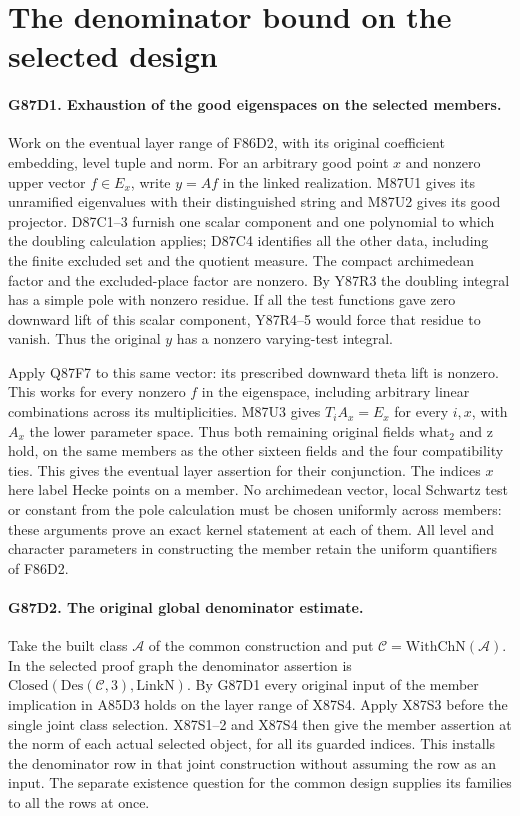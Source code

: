 \section{The denominator bound on the selected design}

\paragraph{G87D1. Exhaustion of the good eigenspaces on the selected members.}
Work on the eventual layer range of F86D2, with its original
coefficient embedding, level tuple and norm. For an arbitrary good
point $x$ and nonzero upper vector $f\in E_x$, write $y=Af$ in
the linked realization. M87U1 gives its unramified eigenvalues
with their distinguished string and M87U2 gives its good projector.
D87C1--3 furnish one scalar component and one polynomial to which
the doubling calculation applies; D87C4 identifies all the other
data, including the finite excluded set and the quotient measure.
The compact archimedean factor and the excluded-place factor are
nonzero. By Y87R3 the doubling integral has a simple pole with
nonzero residue. If all the test functions gave zero downward
lift of this scalar component, Y87R4--5 would force that residue
to vanish. Thus the original $y$ has a nonzero varying-test
integral.

Apply Q87F7 to this same vector: its prescribed downward theta
lift is nonzero. This works for every nonzero $f$ in the eigenspace,
including arbitrary linear combinations across its multiplicities.
M87U3 gives $T_iA_x=E_x$ for every $i,x$, with $A_x$ the lower
parameter space. Thus both remaining original fields
$\mathrm{what}_2$ and $\mathrm z$ hold, on the same members
as the other sixteen fields and the four compatibility ties.
This gives the eventual layer assertion for their conjunction.
The indices $x$ here label Hecke points on a member. No
archimedean vector, local Schwartz test or constant from the
pole calculation must be chosen uniformly across members:
these arguments prove an exact kernel statement at each of them.
All level and character parameters in constructing the member
retain the uniform quantifiers of F86D2.

\paragraph{G87D2. The original global denominator estimate.}
Take the built class $\mathcal A$ of the common construction and
put $\mathcal C=\mathrm{WithChN}(\mathcal A)$. In the selected
proof graph the denominator assertion is
$\mathrm{Closed}(\mathrm{Des}(\mathcal C,3),\mathrm{LinkN})$.
By G87D1 every original input of the member implication in
A85D3 holds on the layer range of X87S4. Apply X87S3 before the
single joint class selection. X87S1--2 and X87S4 then give the
member assertion at the norm of each actual selected object, for
all its guarded indices. This installs the denominator row in
that joint construction without assuming the row as an input.
The separate existence question for the common design supplies
its families to all the rows at once.

